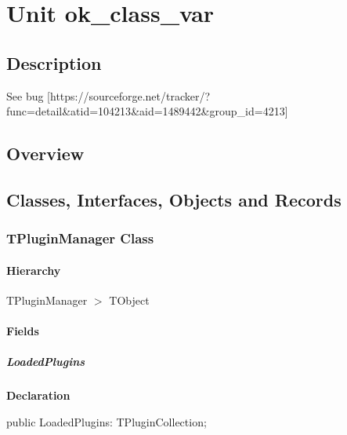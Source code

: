 \documentclass{report}
\begin{document}
\newlength{\tmplength}
\chapter{Unit ok{\_}class{\_}var}
\section{Description}
See bug [https://sourceforge.net/tracker/?func=detail{\&}atid=104213{\&}aid=1489442{\&}group{\_}id=4213]
\section{Overview}
\begin{description}
\item[\texttt{\begin{ttfamily}TPluginManager\end{ttfamily} Class}]
\end{description}
\section{Classes, Interfaces, Objects and Records}
\subsection*{TPluginManager Class}
\subsubsection*{\large{\textbf{Hierarchy}}\normalsize\hspace{1ex}\hfill}
TPluginManager {$>$} TObject
\subsubsection*{\large{\textbf{Fields}}\normalsize\hspace{1ex}\hfill}
\paragraph*{LoadedPlugins}\hspace*{\fill}

\begin{list}{}{
\setlength{\itemindent}{0cm}
\setlength{\listparindent}{0cm}
\setlength{\leftmargin}{\evensidemargin}
\addtolength{\leftmargin}{\tmplength}
\settowidth{\labelsep}{X}
\addtolength{\leftmargin}{\labelsep}
\setlength{\labelwidth}{\tmplength}
}
\begin{flushleft}
\item[\textbf{Declaration}\hfill]
\begin{ttfamily}
public LoadedPlugins: TPluginCollection;\end{ttfamily}


\end{flushleft}
\end{list}
\end{document}

